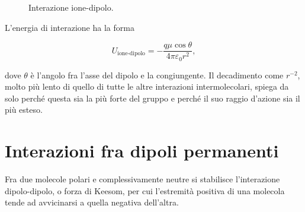 \begin{figure}[htbp]
    \centering
    \caption{Interazione ione-dipolo.}
    \label{fig:ione-dipolo}
\end{figure}

L'energia di interazione ha la forma

\begin{equation}
    U_{\text{ione-dipolo}} = -\frac{q\mu\cos\theta}{4\pi\varepsilon_0 r^2},
    \label{eq:ionedipolo}
\end{equation}

dove $\theta$ è l'angolo fra l'asse del dipolo e la congiungente.
Il decadimento come $r^{-2}$, molto più lento di quello di tutte le altre interazioni intermolecolari, spiega da solo perché questa sia la più forte del gruppo e perché il suo raggio d'azione sia il più esteso.

\section{Interazioni fra dipoli permanenti}

Fra due molecole polari e complessivamente neutre si stabilisce l'interazione dipolo-dipolo, o forza di Keesom, per cui l'estremità positiva di una molecola tende ad avvicinarsi a quella negativa dell'altra.

